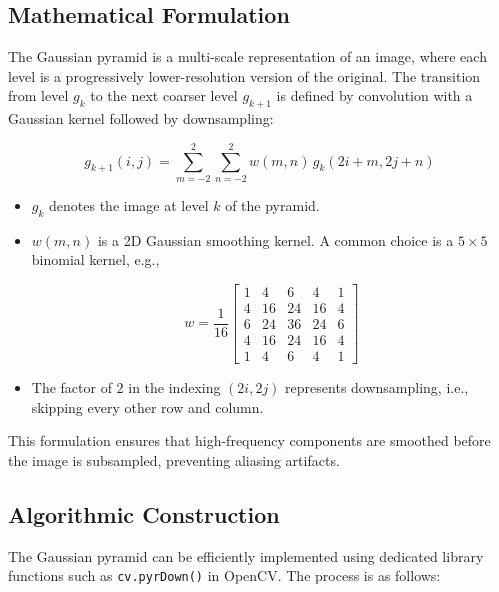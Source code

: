 \documentclass[12pt]{article}
\begin{document}
\subsection{Mathematical Formulation}

The Gaussian pyramid is a multi-scale representation of an image, where each level is a progressively lower-resolution version of the original. The transition from level $g_k$ to the next coarser level $g_{k+1}$ is defined by convolution with a Gaussian kernel followed by downsampling:

\[
    g_{k+1}(i,j) = \sum_{m=-2}^{2} \sum_{n=-2}^{2} w(m,n) \, g_k(2i+m, 2j+n)
\]

\begin{itemize}
    \item $g_k$ denotes the image at level $k$ of the pyramid.
    \item $w(m,n)$ is a 2D Gaussian smoothing kernel. A common choice is a $5 \times 5$ binomial kernel, e.g.,

          \[
              w = \frac{1}{16} \begin{bmatrix} 1 & 4 & 6 & 4 & 1 \\ 4 & 16 & 24 & 16 & 4 \\ 6 & 24 & 36 & 24 & 6 \\ 4 & 16 & 24 & 16 & 4 \\ 1 & 4 & 6 & 4 & 1 \end{bmatrix}
          \]

    \item The factor of $2$ in the indexing $(2i,2j)$ represents downsampling, i.e., skipping every other row and column.
\end{itemize}

This formulation ensures that high-frequency components are smoothed before the image is subsampled, preventing aliasing artifacts.

\subsection{Algorithmic Construction}

The Gaussian pyramid can be efficiently implemented using dedicated library functions such as \texttt{cv.pyrDown()} in OpenCV. The process is as follows:
\end{document}
